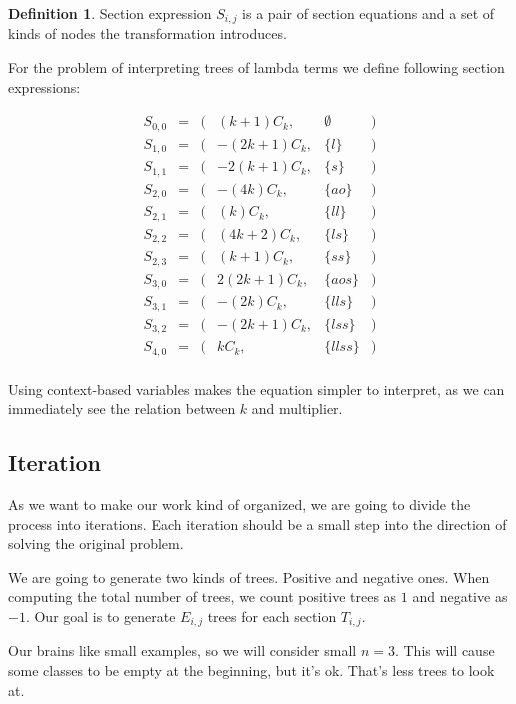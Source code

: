 \documentclass[final]{article}
\theoremstyle{definition}
\newtheorem{definition}{Definition}[subsection]
\theoremstyle{remark}
\begin{document}
\begin{definition}
    Section expression \(S_{i, j}\) is a pair of section equations and a set of kinds of nodes the transformation introduces.
\end{definition}

For the problem of interpreting trees of lambda terms we define following section expressions:

\[\begin{array}{rccrlc}
        S_{0,0} &=& (& (k + 1) C_k,& \emptyset &)\\
        S_{1,0} &=& (& - (2 k + 1) C_k,& \{l\} &)\\
        S_{1,1} &=& (& - 2 (k + 1) C_k,& \{s\} &)\\
        S_{2,0} &=& (& - (4 k) C_k,& \{ao\} &)\\
        S_{2,1} &=& (& (k) C_k,& \{ll\} &)\\
        S_{2,2} &=& (& (4 k + 2) C_k,& \{ls\} &)\\
        S_{2,3} &=& (& (k + 1) C_k,& \{ss\} &)\\
        S_{3,0} &=& (& 2 (2 k + 1) C_k,& \{aos\} &)\\
        S_{3,1} &=& (& - (2 k) C_k,& \{lls\} &)\\
        S_{3,2} &=& (& - (2 k + 1) C_k,& \{lss\} &)\\
        S_{4,0} &=& (& k C_k,& \{llss\} &)\\
\end{array}\]

Using context-based variables makes the equation simpler to interpret, as we can immediately see the relation between \(k\) and multiplier.

\subsection{Iteration}%
\label{sub:iteration}

As we want to make our work kind of organized, we are going to divide the process into iterations. Each iteration should be a small step into the direction of solving the original problem.

We are going to generate two kinds of trees. Positive and negative ones. When computing the total number of trees, we count positive trees as \(1\) and negative as \(-1\). Our goal is to generate \(E_{i, j}\) trees for each section \(T_{i, j}\).

Our brains like small examples, so we will consider small \(n = 3\). This will cause some classes to be empty at the beginning, but it's ok. That's less trees to look at.
\end{document}
